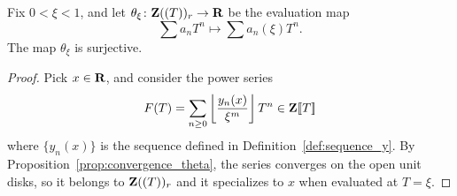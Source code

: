 \begin{theorem}
Fix $0<\xi <1$, and let $\theta_{\xi}\colon \mathbf{Z}((T))_r\rightarrow \mathbf{R}$ be the evaluation map
\[
\sum a_nT^n\longmapsto \sum a_n(\xi)T^n.
\]
The map $\theta_{\xi}$ is surjective.
\end{theorem}
\begin{proof}
Pick $x\in \mathbf{R}$, and consider the power series
\[
F(T)=\sum_{n\geq 0}\left\lfloor \frac{y_n(x)}{\xi^m}\right\rfloor T^n\in\mathbf{Z}[\![T]\!]
\]
where $\{y_n(x)\}$ is the sequence defined in Definition~\ref{def:sequence_y}. By Proposition~\ref{prop:convergence_theta}, the series converges on the open unit disks, so it belongs to $\mathbf{Z}((T))_r$ and it specializes to $x$ when evaluated at $T=\xi$.
\end{proof}

